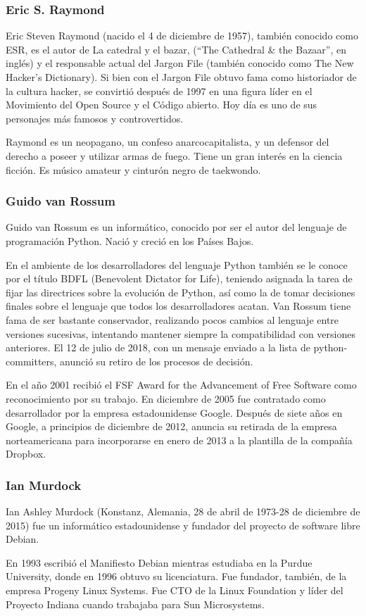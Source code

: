 \subsubsection{Eric S. Raymond}
Eric Steven Raymond (nacido el 4 de diciembre de 1957), también conocido como ESR, es el autor de La catedral y el bazar, (``The Cathedral \& the Bazaar'', en inglés) y el responsable actual del Jargon File (también conocido como The New Hacker's Dictionary). Si bien con el Jargon File obtuvo fama como historiador de la cultura hacker, se convirtió después de 1997 en una figura líder en el Movimiento del Open Source y el Código abierto. Hoy día es uno de sus personajes más famosos y controvertidos.

Raymond es un neopagano, un confeso anarcocapitalista, y un defensor del derecho a poseer y utilizar armas de fuego. Tiene un gran interés en la ciencia ficción. Es músico amateur y cinturón negro de taekwondo.

\subsubsection{Guido van Rossum}
Guido van Rossum es un informático, conocido por ser el autor del lenguaje de programación Python. Nació y creció en los Países Bajos.

En el ambiente de los desarrolladores del lenguaje Python también se le conoce por el título BDFL (Benevolent Dictator for Life), teniendo asignada la tarea de fijar las directrices sobre la evolución de Python, así como la de tomar decisiones finales sobre el lenguaje que todos los desarrolladores acatan. Van Rossum tiene fama de ser bastante conservador, realizando pocos cambios al lenguaje entre versiones sucesivas, intentando mantener siempre la compatibilidad con versiones anteriores. El 12 de julio de 2018, con un mensaje enviado a la lista de python-committers, anunció su retiro de los procesos de decisión.

En el año 2001 recibió el FSF Award for the Advancement of Free Software como reconocimiento por su trabajo. En diciembre de 2005 fue contratado como desarrollador por la empresa estadounidense Google. Después de siete años en Google, a principios de diciembre de 2012, anuncia su retirada de la empresa norteamericana para incorporarse en enero de 2013 a la plantilla de la compañía Dropbox.

\subsubsection{Ian Murdock}
Ian Ashley Murdock (Konstanz, Alemania, 28 de abril de 1973-28 de diciembre de 2015) fue un informático estadounidense y fundador del proyecto de software libre Debian.

En 1993 escribió el Manifiesto Debian mientras estudiaba en la Purdue University, donde en 1996 obtuvo su licenciatura. Fue fundador, también, de la empresa Progeny Linux Systems. Fue CTO de la Linux Foundation y líder del Proyecto Indiana cuando trabajaba para Sun Microsystems.